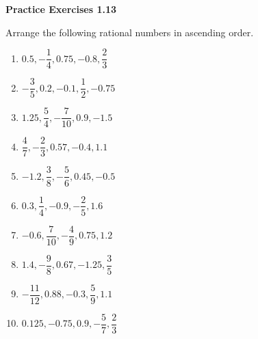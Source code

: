 \vspace{0.3ex}
\noindent\textbf{Practice Exercises 1.13}

\vspace{0.2ex}

Arrange the following rational numbers in ascending order. %
\begin{multicols}{2}
\begin{enumerate}
    \item \(0.5, -\dfrac{1}{4}, 0.75, -0.8, \dfrac{2}{3}\)
    \item \(-\dfrac{3}{5}, 0.2, -0.1, \dfrac{1}{2}, -0.75\)
    \item \(1.25, \dfrac{5}{4}, -\dfrac{7}{10}, 0.9, -1.5\)
    \item \(\dfrac{4}{7}, -\dfrac{2}{3}, 0.57, -0.4, 1.1\)
    \item \(-1.2, \dfrac{3}{8}, -\dfrac{5}{6}, 0.45, -0.5\)
    \item \(0.3, \dfrac{1}{4}, -0.9, -\dfrac{2}{5}, 1.6\)
    \item \(-0.6, \dfrac{7}{10}, -\dfrac{4}{9}, 0.75, 1.2\)
    \item \(1.4, -\dfrac{9}{8}, 0.67, -1.25, \dfrac{3}{5}\)
    \item \(-\dfrac{11}{12}, 0.88, -0.3, \dfrac{5}{9}, 1.1\)
    \item \(0.125, -0.75, 0.9, -\dfrac{5}{7}, \dfrac{2}{3}\)
    \end{enumerate}
\end{multicols}
